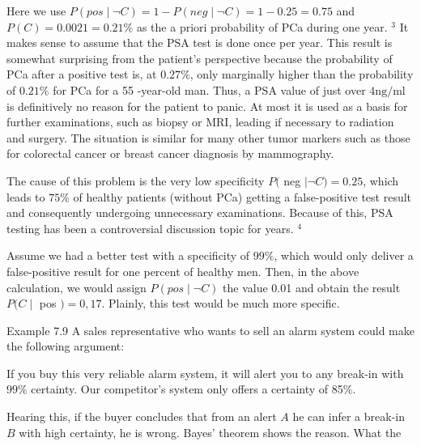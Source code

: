 \documentclass[10pt]{book}
\begin{document}
Here we use $P(p o s \mid \neg C)=1-P(n e g \mid \neg C)=1-0.25=0.75$ and $P(C)= 0.0021=0.21 \%$ as the a priori probability of PCa during one year. ${ }^{3}$ It makes sense to assume that the PSA test is done once per year. This result is somewhat surprising from the patient's perspective because the probability of PCa after a positive test is, at $0.27 \%$, only marginally higher than the probability of $0.21 \%$ for PCa for a 55 -year-old man. Thus, a PSA value of just over $4 \mathrm{ng} / \mathrm{ml}$ is definitively no reason for the patient to panic. At most it is used as a basis for further examinations, such as biopsy or MRI, leading if necessary to radiation and surgery. The situation is similar for many other tumor markers such as those for colorectal cancer or breast cancer diagnosis by mammography.

The cause of this problem is the very low specificity $P($ neg $\mid \neg C)=0.25$, which leads to $75 \%$ of healthy patients (without PCa) getting a false-positive test result and consequently undergoing unnecessary examinations. Because of this, PSA testing has been a controversial discussion topic for years. ${ }^{4}$

Assume we had a better test with a specificity of $99 \%$, which would only deliver a false-positive result for one percent of healthy men. Then, in the above calculation, we would assign $P(p o s \mid \neg C)$ the value 0.01 and obtain the result $P(C \mid$ pos $)=0,17$. Plainly, this test would be much more specific.

Example 7.9 A sales representative who wants to sell an alarm system could make the following argument:

If you buy this very reliable alarm system, it will alert you to any break-in with $99 \%$ certainty. Our competitor's system only offers a certainty of 85\%.

Hearing this, if the buyer concludes that from an alert $A$ he can infer a break-in $B$ with high certainty, he is wrong. Bayes' theorem shows the reason. What the
\end{document}

